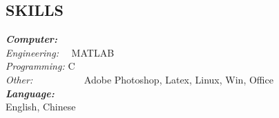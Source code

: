 \documentclass[margin]{res}
\begin{document}
\begin{resume}
            
                
\section{ SKILLS }  \textbf {\textit {Computer:}}\\  
 {\sl Engineering:}  \ \ MATLAB\\ 
 {\sl Programming:} C\\
 {\sl Other:} \ \ \ \ \ \ \ \ \ \ Adobe Photoshop, Latex,  Linux, Win, Office\\
    \textbf {\textit {Language:}} \\ English, Chinese\\

      
                 
 

\end{resume}
\end{document}
